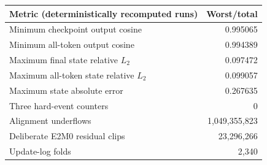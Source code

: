 \begin{tabular}{lr}
\toprule
Metric (deterministically recomputed runs) & Worst/total \\
\midrule
Minimum checkpoint output cosine & 0.995065 \\
Minimum all-token output cosine & 0.994389 \\
Maximum final state relative $L_2$ & 0.097472 \\
Maximum all-token state relative $L_2$ & 0.099057 \\
Maximum state absolute error & 0.267635 \\
Three hard-event counters & 0 \\
Alignment underflows & 1{,}049{,}355{,}823 \\
Deliberate E2M0 residual clips & 23{,}296{,}266 \\
Update-log folds & 2{,}340 \\
\bottomrule
\end{tabular}
